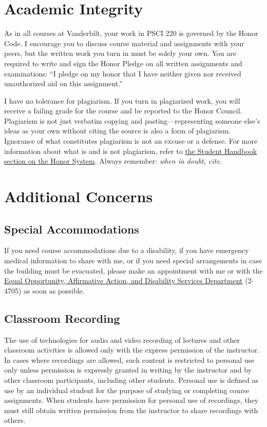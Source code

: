 \section{Academic Integrity}\label{academic-integrity}

As in all courses at Vanderbilt, your work in PSCI 220 is governed by
the Honor Code. I encourage you to discuss course material and
assignments with your peers, but the written work you turn in must be
solely your own. You are required to write and sign the Honor Pledge on
all written assignments and examinations: ``I pledge on my honor that I
have neither given nor received unauthorized aid on this assignment.''

I have no tolerance for plagiarism. If you turn in plagiarized work, you
will receive a failing grade for the course and be reported to the Honor
Council. Plagiarism is not just verbatim copying and
pasting---representing someone else's ideas as your own without citing
the source is also a form of plagiarism. Ignorance of what constitutes
plagiarism is not an excuse or a defense. For more information about
what is and is not plagiarism, refer to
\href{http://www.vanderbilt.edu/student_handbook/the-honor-system/}{the
Student Handbook section on the Honor System}. Always remember:
\emph{when in doubt, cite.}

\section{Additional Concerns}\label{additional-concerns}

\subsection{Special Accommodations}\label{special-accommodations}

If you need course accommodations due to a disability, if you have
emergency medical information to share with me, or if you need special
arrangements in case the building must be evacuated, please make an
appointment with me or with the
\href{http://www.vanderbilt.edu/ead/}{Equal Opportunity, Affirmative
Action, and Disability Services Department} (2-4705) as soon as
possible.

\subsection{Classroom Recording}\label{classroom-recording}

The use of technologies for audio and video recording of lectures and
other classroom activities is allowed only with the express permission
of the instructor. In cases where recordings are allowed, such content
is restricted to personal use only unless permission is expressly
granted in writing by the instructor and by other classroom
participants, including other students. Personal use is defined as use
by an individual student for the purpose of studying or completing
course assignments. When students have permission for personal use of
recordings, they must still obtain written permission from the
instructor to share recordings with others.

